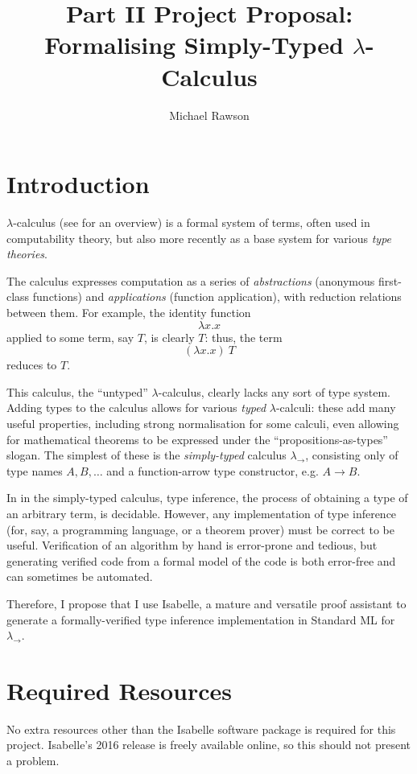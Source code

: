 \documentclass[12pt]{article}
\title{Part II Project Proposal: Formalising Simply-Typed \(\lambda\)-Calculus}
\author{Michael Rawson}
\begin{document}


\section*{Introduction}
\(\lambda\)-calculus (see \parencite{lambda-overview} for an overview) is a formal system of terms, often used in computability theory, but also more recently as a base system for various \emph{type theories}.

The calculus expresses computation as a series of \emph{abstractions} (anonymous first-class functions) and \emph{applications} (function application), with reduction relations between them.
For example, the identity function
\[
\lambda x.x
\]
applied to some term, say \(T\), is clearly \(T\): thus, the term
\[
(\lambda x.x)\ T
\]
reduces to \(T\).

This calculus, the ``untyped'' \(\lambda\)-calculus, clearly lacks any sort of type system.
Adding types to the calculus allows for various \emph{typed} \(\lambda\)-calculi: these add many useful properties, including strong normalisation for some calculi\parencite{strong-normalisation}, even allowing for mathematical theorems to be expressed under the ``propositions-as-types'' slogan\parencite{curry-howard}.
The simplest of these is the \emph{simply-typed} calculus \(\lambda_\to\), consisting only of type names \(A, B, \ldots\) and a function-arrow type constructor, e.g. \(A \to B\).

In in the simply-typed calculus, type inference, the process of obtaining a type of an arbitrary term, is decidable.
However, any implementation of type inference (for, say, a programming language, or a theorem prover) must be correct to be useful.
Verification of an algorithm by hand is error-prone and tedious, but generating verified code from a formal model of the code is both error-free and can sometimes be automated.

Therefore, I propose that I use Isabelle, a mature and versatile proof assistant \parencite{isabelle-overview} to generate a formally-verified type inference implementation in Standard ML for \(\lambda_\to\).

\section*{Required Resources}
No extra resources other than the Isabelle software package is required for this project.
Isabelle's 2016 release is freely available online\parencite{isabelle-installation}, so this should not present a problem.
\end{document}
